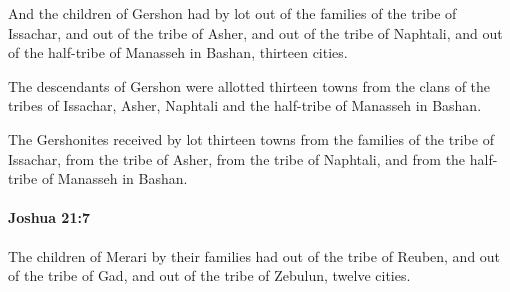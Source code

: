 			\begin{versebox}
					\item[BHS] 
					\item[ASV] And the children of Gershon had by lot out of the families of the tribe of Issachar, and out of the tribe of Asher, and out of the tribe of Naphtali, and out of the half-tribe of Manasseh in Bashan, thirteen cities.
					\item[NIV] The descendants of Gershon were allotted thirteen towns from the clans of the tribes of Issachar, Asher, Naphtali and the half-tribe of Manasseh in Bashan.
					\item[NRSV] The Gershonites received by lot thirteen towns from the families of the tribe of Issachar, from the tribe of Asher, from the tribe of Naphtali, and from the half-tribe of Manasseh in Bashan.
			\end{versebox}

		\paragraph{Joshua 21:7} %
			\label{JOSHUA-21-7}

			The children of Merari by their families had out of the tribe of Reuben, and out of the tribe of Gad, and out of the tribe of Zebulun, twelve cities.

